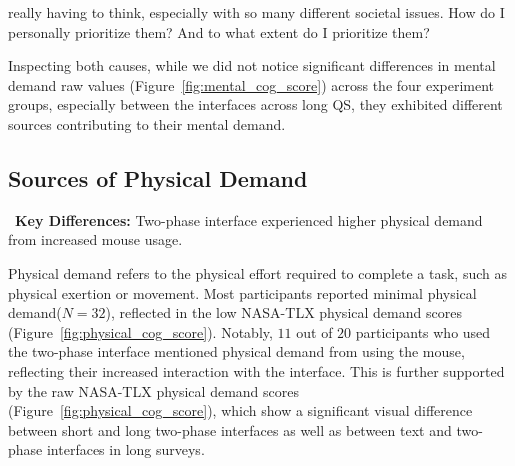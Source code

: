\begin{displayquote}
\bracketellipsis really having to think, especially with so many different societal issues. How do I personally prioritize them? And to what extent do I prioritize them? \hfill{}
\end{displayquote}

Inspecting both causes, while we did not notice significant differences in mental demand raw values (Figure~\ref{fig:mental_cog_score}) across the four experiment groups, especially between the interfaces across long QS, they exhibited different sources contributing to their mental demand.



\subsection{Sources of Physical Demand} 
\label{sec:physical}

\begin{tldrbox}
   \faKey~\textbf{Key Differences:} Two-phase interface experienced higher physical demand from increased mouse usage.
\end{tldrbox}


Physical demand refers to the physical effort required to complete a task, such as physical exertion or movement. Most participants reported minimal physical demand($N=32$), reflected in the low NASA-TLX physical demand scores (Figure~\ref{fig:physical_cog_score}). Notably, $11$ out of $20$ participants who used the two-phase interface mentioned physical demand from using the mouse, reflecting their increased interaction with the interface. This is further supported by the raw NASA-TLX physical demand scores (Figure~\ref{fig:physical_cog_score}), which show a significant visual difference between short and long two-phase interfaces as well as between text and two-phase interfaces in long surveys.

